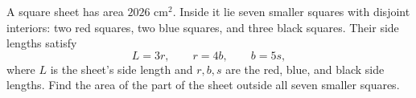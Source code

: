 A square sheet has area $2026\text{ cm}^2$. Inside it lie seven smaller squares with disjoint interiors: two red squares, two blue squares, and three black squares. Their side lengths satisfy
\[
L=3r,\qquad r=4b,\qquad b=5s,
\]
where $L$ is the sheet's side length and $r,b,s$ are the red, blue, and black side lengths. Find the area of the part of the sheet outside all seven smaller squares.
